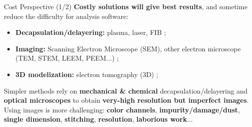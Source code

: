 \documentclass[aspectratio=169]{beamer}
\begin{document}
	\begin{frame}{Cost Perspective (1/2)}
		\textbf{Costly solutions will give best results}, and sometime reduce the difficulty for analysis software:
		\begin{itemize}
			\item \textbf{Decapsulation/delayering:} plasma, laser, FIB ;
			\item \textbf{Imaging:} Scanning Electron Microscope (SEM), other electron microscope (TEM, STEM, LEEM, PEEM...) ;
			\item \textbf{3D modelization:} electron tomography (3D) ;
		\end{itemize}
		
		\vspace{3mm}
		
		Simpler methods rely on \textbf{mechanical \& chemical} decapsulation/delayering and \textbf{optical microscopes} to obtain \textbf{very-high resolution but imperfect images}. Using images is more challenging: \textbf{color channels}, \textbf{impurity/damage/dust}, \textbf{single dimension}, \textbf{stitching}, \textbf{resolution}, \textbf{laborious work}...
	\end{frame}
	
\end{document}
